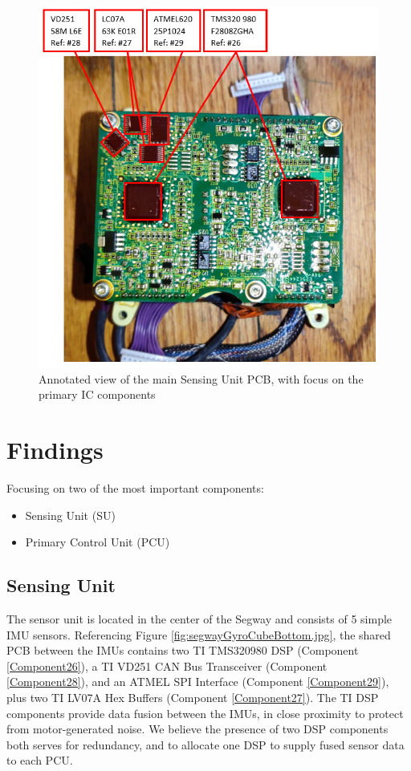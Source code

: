 \documentclass[]{formalLabReport}
\begin{document}
\begin{figure}
    \includegraphics[]{annotatedGyroCubeBottom.png}
    \caption{Annotated view of the main Sensing Unit PCB, with focus on the primary IC components}
    \label{fig:annotatedGyroCubeBottom.jpg}
\end{figure}

\section{Findings}
Focusing on two of the most important components:
\begin{itemize}
    \item Sensing Unit (SU)
    \item Primary Control Unit (PCU)
\end{itemize}

\subsection{Sensing Unit}
The sensor unit is located in the center of the Segway and consists of 5 simple IMU sensors. Referencing Figure \underline{\ref{fig:segwayGyroCubeBottom.jpg}}, the shared PCB between the IMUs contains two TI TMS320980 DSP (Component \underline{\ref{Component26}}), a TI VD251 CAN Bus Transceiver (Component \underline{\ref{Component28}}), and an ATMEL SPI Interface (Component \underline{\ref{Component29}}), plus two TI LV07A Hex Buffers (Component \underline{\ref{Component27}}). The TI DSP components provide data fusion between the IMUs, in close proximity to protect from motor-generated noise. We believe the presence of two DSP components both serves for redundancy, and to allocate one DSP to supply fused sensor data to each PCU.
\end{document}
